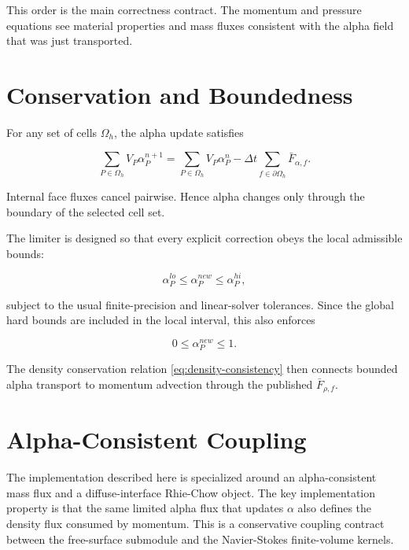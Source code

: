\documentclass[11pt]{article}
\begin{document}
This order is the main correctness contract.  The momentum and pressure
equations see material properties and mass fluxes consistent with the alpha
field that was just transported.

\section{Conservation and Boundedness}

For any set of cells \(\Omega_h\), the alpha update satisfies

\begin{equation}
  \sum_{P\in\Omega_h}V_P\alpha_P^{n+1}
  =
  \sum_{P\in\Omega_h}V_P\alpha_P^n
  -
  \Delta t
  \sum_{f\in\partial\Omega_h}
  \bar{F}_{\alpha,f}.
\end{equation}

Internal face fluxes cancel pairwise.  Hence alpha changes only through the
boundary of the selected cell set.

The limiter is designed so that every explicit correction obeys the local
admissible bounds:

\begin{equation}
  \alpha_P^{lo}
  \le
  \alpha_P^{new}
  \le
  \alpha_P^{hi},
\end{equation}

subject to the usual finite-precision and linear-solver tolerances.  Since the
global hard bounds are included in the local interval, this also enforces

\begin{equation}
  0\le\alpha_P^{new}\le 1.
\end{equation}

The density conservation relation \eqref{eq:density-consistency} then connects
bounded alpha transport to momentum advection through the published
\(\bar{F}_{\rho,f}\).

\section{Alpha-Consistent Coupling}

The implementation described here is specialized around an
alpha-consistent mass flux and a diffuse-interface Rhie-Chow object.  The key
implementation property is that the same limited alpha flux that updates
\(\alpha\) also defines the density flux consumed by momentum.  This is a
conservative coupling contract between the free-surface submodule and the
Navier-Stokes finite-volume kernels.
\end{document}
